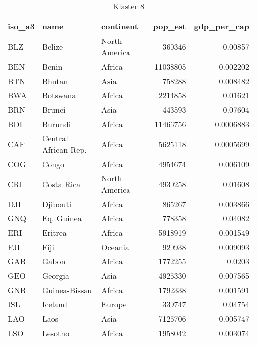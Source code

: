 \begin{table}[h!]
   \centering
   \caption{Klaster 8}
   \label{tab:cl8}
   \begin{tabular}{lllrr}
      \toprule
      iso\_a3 & name                 & continent     & pop\_est & gdp\_per\_cap \\
      \midrule
      BLZ     & Belize               & North America & 360346   & 0.00857       \\
      BEN     & Benin                & Africa        & 11038805 & 0.002202      \\
      BTN     & Bhutan               & Asia          & 758288   & 0.008482      \\
      BWA     & Botswana             & Africa        & 2214858  & 0.01621       \\
      BRN     & Brunei               & Asia          & 443593   & 0.07604       \\
      BDI     & Burundi              & Africa        & 11466756 & 0.0006883     \\
      CAF     & Central African Rep. & Africa        & 5625118  & 0.0005699     \\
      COG     & Congo                & Africa        & 4954674  & 0.006109      \\
      CRI     & Costa Rica           & North America & 4930258  & 0.01608       \\
      DJI     & Djibouti             & Africa        & 865267   & 0.003866      \\
      GNQ     & Eq. Guinea           & Africa        & 778358   & 0.04082       \\
      ERI     & Eritrea              & Africa        & 5918919  & 0.001549      \\
      FJI     & Fiji                 & Oceania       & 920938   & 0.009093      \\
      GAB     & Gabon                & Africa        & 1772255  & 0.0203        \\
      GEO     & Georgia              & Asia          & 4926330  & 0.007565      \\
      GNB     & Guinea-Bissau        & Africa        & 1792338  & 0.001591      \\
      ISL     & Iceland              & Europe        & 339747   & 0.04754       \\
      LAO     & Laos                 & Asia          & 7126706  & 0.005747      \\
      LSO     & Lesotho              & Africa        & 1958042  & 0.003074      \\

\end{tabular}
\end{table}
